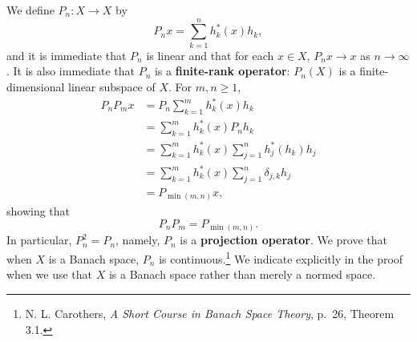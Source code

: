 \documentclass{article}
\theoremstyle{definition}
\begin{document}
We define $P_n:X \to X$ by
\[
P_n x=\sum_{k=1}^n h_k^*(x) h_k,
\]
 and it is immediate that $P_n$ is linear and that
for each $x \in X$, $P_nx \to x$ as $n \to \infty$. It is also immediate that $P_n$ is a \textbf{finite-rank operator}: $P_n(X)$ is a finite-dimensional linear subspace
of $X$.
For $m,n \geq 1$,
\begin{align*}
P_n P_m x &= P_n \sum_{k=1}^m h_k^*(x) h_k\\
& = \sum_{k=1}^m h_k^*(x) P_n h_k\\
&=\sum_{k=1}^m h_k^*(x) \sum_{j=1}^n h_j^*(h_k) h_j\\
&=\sum_{k=1}^m h_k^*(x) \sum_{j=1}^n \delta_{j,k} h_j\\
&=P_{\min(m,n)} x,
\end{align*}
showing that 
\[
P_n P_m = P_{\min(m,n)}.
\]
In particular, $P_n^2 = P_n$, namely, $P_n$ is a \textbf{projection operator}. 
We prove that when $X$ is a Banach space, $P_n$ is continuous.\footnote{N. L. Carothers, {\em A Short Course
in Banach Space Theory}, p.~26, Theorem 3.1.} We indicate explicitly in the proof
when we use that $X$ is a Banach space rather than merely a normed space. 
\end{document}
